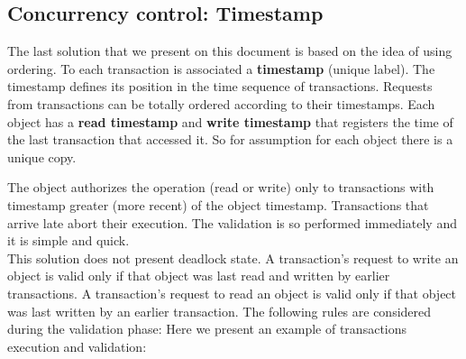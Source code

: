\subsection{Concurrency control: Timestamp}
The last solution that we present on this document is based on the idea of using ordering. To each transaction is associated a \textbf{timestamp} (unique label). The timestamp defines its position in the time sequence of transactions. Requests from transactions can be totally ordered according to their timestamps.
Each object has a \textbf{read timestamp} and \textbf{write timestamp} that registers the time of the last transaction that accessed it. So for assumption for each object there is a unique copy.

The object authorizes the operation (read or write) only to transactions with timestamp greater (more recent) of the object timestamp. Transactions that arrive late abort their execution. The validation is so performed immediately and it is simple and quick.\\ 
This solution does not present deadlock state.
A transaction’s request to write an object is valid only if that object was last read and written by earlier transactions. A transaction’s request to read an object is valid only if that object was last written by an earlier transaction.
The following rules are considered during the validation phase:
Here we present an example of transactions execution and validation:

